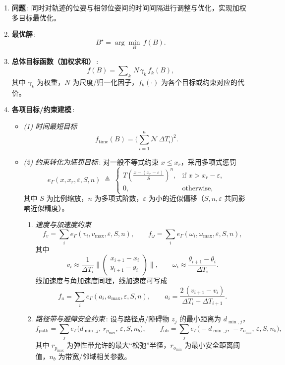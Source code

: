 \documentclass[../main.tex]{subfiles}
\begin{document}
\begin{enumerate}
\begin{itemize}
{\begin{enumerate}
  \item \textbf{问题}\,: 同时对轨迹的位姿与相邻位姿间的时间间隔进行调整与优化，实现加权多目标最优化。

  \item \textbf{最优解}\,:  
  \[
     B^{\star}=\arg\min_{B}\,f(B).
  \]

  \item \textbf{总体目标函数（加权求和）}\,:  
  \[
     f(B)=\sum\nolimits_{k}\,N\,\gamma_k\,f_k(B),
  \]
  其中 $\gamma_k$ 为权重，$N$ 为尺度/归一化因子，$f_k(\cdot)$ 为各个目标或约束对应的代价。

  \item \textbf{各项目标/约束建模}\,:  
  \begin{itemize}
    \item \emph{(1) 时间最短目标}  
    \[
       f_{\text{time}}(B)=\Big(\sum_{i=1}^{n} \mathcal{N}\,\Delta T_i\Big)^2 .
    \]
    \item \emph{(2) 约束转化为惩罚目标}\,: 对一般不等式约束 $x\le x_r$，采用多项式惩罚
    \[
      e_{\Gamma}(x,x_r,\varepsilon,S,n)\; \triangleq\;
      \begin{cases}
        \displaystyle T\!\left(\frac{x-(x_r-\varepsilon)}{S}\right)^{\!n}, & \text{if } x>x_r-\varepsilon,\\[6pt]
        0, & \text{otherwise},
      \end{cases}
    \]
    其中 $S$ 为比例缩放，$n$ 为多项式阶数，$\varepsilon$ 为小的近似偏移（$S,n,\varepsilon$ 共同影响近似精度）。
    \begin{enumerate}
    \item \emph{速度与加速度约束}
    \[
      f_v=\sum_i e_{\Gamma}(v_i,v_{\max},\varepsilon,S,n),\qquad
      f_\omega=\sum_i e_{\Gamma}(\omega_i,\omega_{\max},\varepsilon,S,n),
    \]
    其中
    \[
      v_i \approx \frac{1}{\Delta T_i}\Big\|\begin{pmatrix}x_{i+1}-x_i\\ y_{i+1}-y_i\end{pmatrix}\Big\|,\qquad
      \omega_i \approx \frac{\theta_{i+1}-\theta_i}{\Delta T_i}.
    \]
    线加速度与角加速度同理，线加速度可写成
    \[
      f_a=\sum_i e_{\Gamma}(a_i,a_{\max},\varepsilon,S,n),\qquad
      a_i=\frac{2\,(v_{i+1}-v_i)}{\Delta T_i+\Delta T_{i+1}}.
    \]

    \item \emph{路径带与避障安全约束}\,: 设与路径点/障碍物 $z_j$ 的最小距离为 $d_{\min,j}$，
    \[
      f_{\text{path}}=\sum_j e_{\Gamma}\!\big(d_{\min,j},\,r_{p_{\max}},\,\varepsilon,S,n_b\big),\qquad
      f_{\text{ob}}=\sum_j e_{\Gamma}\!\big(-d_{\min,j},\,-r_{o_{\min}},\,\varepsilon,S,n_b\big),
    \]
    其中 $r_{p_{\max}}$ 为弹性带允许的最大“松弛”半径，$r_{o_{\min}}$ 为最小安全距离阈值，$n_b$ 为带宽/邻域相关参数。


\end{enumerate}
\end{itemize}
\end{enumerate}}
\end{itemize}
\end{enumerate}
\end{document}
